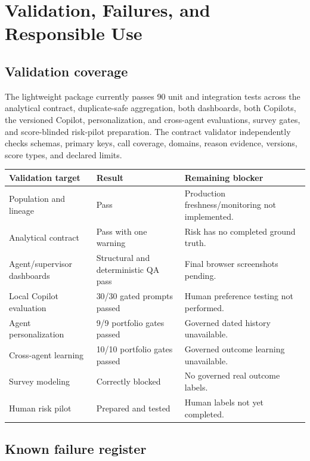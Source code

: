 \documentclass[11pt,letterpaper]{article}
\begin{document}
\clearpage
\section{Validation, Failures, and Responsible Use}

\subsection{Validation coverage}

The lightweight package currently passes 90 unit and integration tests across the
analytical contract, duplicate-safe aggregation, both dashboards, both Copilots,
the versioned Copilot, personalization, and cross-agent evaluations, survey gates, and score-blinded risk-pilot
preparation. The contract validator independently checks schemas, primary keys,
call coverage, domains, reason evidence, versions, score types, and declared limits.

\begin{center}\small
\begin{tabular}{p{}p{}p{}}
\toprule
Validation target & Result & Remaining blocker \\
\midrule
Population and lineage & Pass & Production freshness/monitoring not implemented. \\
Analytical contract & Pass with one warning & Risk has no completed ground truth. \\
Agent/supervisor dashboards & Structural and deterministic QA pass & Final browser screenshots pending. \\
Local Copilot evaluation & 30/30 gated prompts passed & Human preference testing not performed. \\
Agent personalization & 9/9 portfolio gates passed & Governed dated history unavailable. \\
Cross-agent learning & 10/10 portfolio gates passed & Governed outcome learning unavailable. \\
Survey modeling & Correctly blocked & No governed real outcome labels. \\
Human risk pilot & Prepared and tested & Human labels not yet completed. \\
\bottomrule
\end{tabular}
\end{center}

\subsection{Known failure register}
\end{document}
